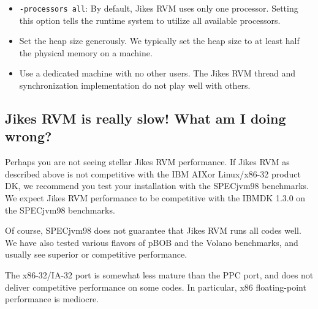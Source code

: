 \begin{itemize}
\item {\tt -processors all}: By default, Jikes\TMweb{} RVM uses only
one processor.  Setting this option tells the runtime system to
utilize all available processors. 
\item Set the heap size generously.  We typically set the heap size to
at least half the physical memory on a machine. 
\item Use a dedicated machine with no other users.  The Jikes RVM
thread and synchronization implementation do not play well with
others. 
\end{itemize}

\subsection{Jikes RVM is really slow! What am I doing wrong?}

Perhaps you are not seeing stellar Jikes\TMweb{} RVM performance.
If Jikes RVM as described above is not competitive with the IBM
AIX\TMweb or Linux\Rweb/x86-32 product DK, we recommend you test
your installation with the SPECjvm\TMweb{}98 benchmarks.  We expect Jikes RVM
performance to be competitive with the IBM\Rweb DK 1.3.0 on the SPECjvm98
benchmarks.

Of course, SPECjvm98 does not guarantee that Jikes RVM runs all codes
well.  We have also tested various flavors of pBOB and the Volano
benchmarks, and usually see superior or competitive performance.

The x86-32\-/\-IA-32 port is somewhat less mature than the PPC port, and does not
deliver competitive performance on some codes.  In particular, x86
floating-point performance is mediocre.

